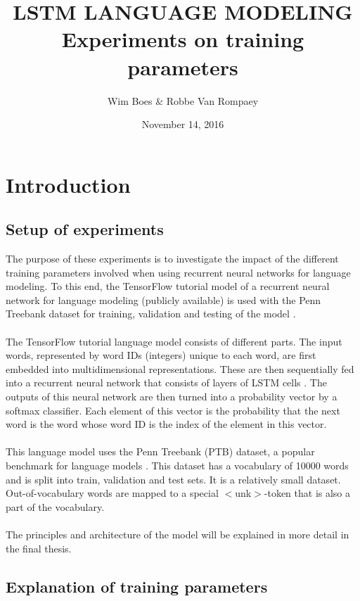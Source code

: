 \documentclass[10pt,a4paper,titlepage]{article}
\author{Wim Boes \& Robbe Van Rompaey}
\title{LSTM LANGUAGE MODELING\\Experiments on training parameters}
\date{November 14, 2016}
\begin{document}
\maketitle	

\setcounter{tocdepth}{2}
\tableofcontents

\newpage

\section{Introduction}

\subsection{Setup of experiments}
\label{sec:setup}

The purpose of these experiments is to investigate the impact of the different training parameters involved when using recurrent neural networks for language modeling. To this end, the TensorFlow tutorial model of a recurrent neural network for language modeling (publicly available) is used with the Penn Treebank dataset for training, validation and testing of the model \cite{tensorflow}.\\
\\
The TensorFlow tutorial language model consists of different parts. The input words, represented by word IDs (integers) unique to each word, are first embedded into multidimensional representations. These are then sequentially fed into a recurrent neural network that consists of layers of LSTM cells \cite{LSTM}. The outputs of this neural network are then turned into a probability vector by a softmax classifier. Each element of this vector is the probability that the next word is the word whose word ID is the index of the element in this vector.\\
\\
This language model uses the Penn Treebank (PTB) dataset, a popular benchmark for language models \cite{PTB}. This dataset has a vocabulary of 10000 words and is split into train, validation and test sets. It is a relatively small dataset. Out-of-vocabulary words are mapped to a special $<$unk$>$-token that is also a part of the vocabulary.\\
\\
The principles and architecture of the model will be explained in more detail in the final thesis.

\subsection{Explanation of training parameters}
\label{subsec:exp}
\end{document}
